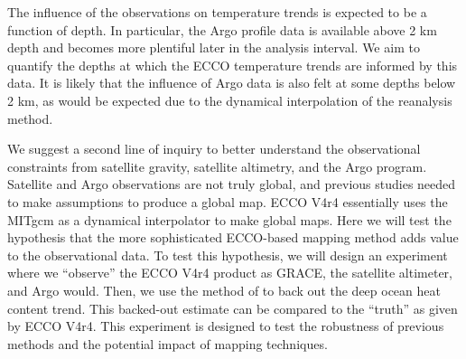 \documentclass[authoryear,round,12pt]{article}
\begin{document}
The influence of the observations on temperature trends is expected to
be a function of depth.  In particular, the Argo profile data is
available above 2 km depth and becomes more plentiful later in the
analysis interval. We aim to quantify the depths at which the ECCO
temperature trends are informed by this data. It is likely that the
influence of Argo data is also felt at some depths below 2 km, as
would be expected due to the dynamical interpolation of the reanalysis
method.

We suggest a second line of inquiry to better understand the
observational constraints from satellite gravity, satellite altimetry,
and the Argo program. Satellite and Argo observations are not truly
global, and previous studies needed to make assumptions to produce a
global map. ECCO V4r4 essentially uses the MITgcm as a dynamical
interpolator to make global maps. Here we will test the hypothesis
that the more sophisticated ECCO-based mapping method adds value to
the observational data. To test this hypothesis, we will design an
experiment where we ``observe'' the ECCO V4r4 product as GRACE, the
satellite altimeter, and Argo would. Then, we use the method of
\citet{Llovel-Willis-2014:Deep} to back out the deep ocean heat
content trend. This backed-out estimate can be compared to the
``truth'' as given by ECCO V4r4. This experiment is designed to test
the robustness of previous methods and the potential impact of mapping
techniques.

\end{document}
